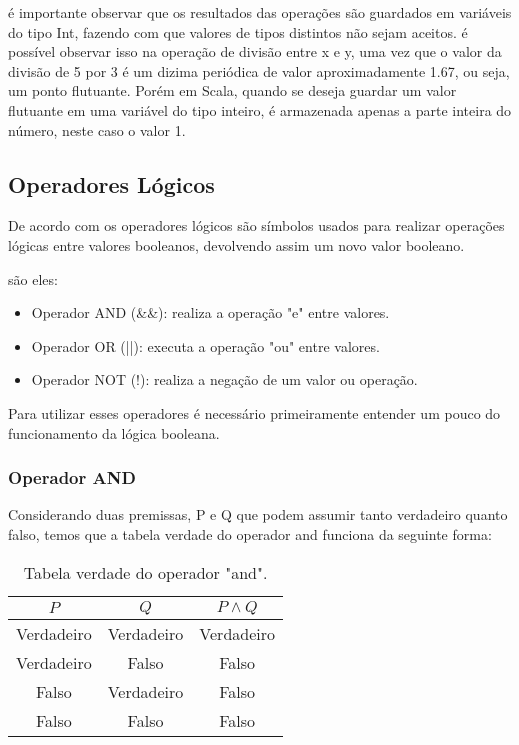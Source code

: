	\'{e} importante observar que os resultados das opera\c{c}\~{o}es s\~{a}o guardados em vari\'{a}veis do tipo Int, fazendo com que valores de tipos distintos não sejam aceitos. \'{e} poss\'{i}vel observar isso na opera\c{c}\~{a}o de divis\~{a}o entre x e y, uma vez que o valor da divis\~{a}o de 5 por 3 \'{e} um dizima periódica de valor aproximadamente 1.67, ou seja, um ponto flutuante. Por\'{e}m em Scala, quando se deseja guardar um valor flutuante em uma vari\'{a}vel do tipo inteiro, \'{e} armazenada apenas a parte inteira do n\'{u}mero, neste caso o valor 1.
	
	\subsection{Operadores L\'{o}gicos}
	
	De acordo com \cite{Wampler2021} os operadores l\'{o}gicos s\~{a}o símbolos usados para realizar opera\c{c}\~{o}es l\'{o}gicas entre valores booleanos, devolvendo assim um novo valor booleano.
	
	s\~{a}o eles:
	
	\begin{itemize}
		\item Operador AND (\&\&): realiza a opera\c{c}\~{a}o "e" entre valores.
		\item Operador OR (||): executa a opera\c{c}\~{a}o "ou" entre valores.
		\item Operador NOT (!): realiza a nega\c{c}\~{a}o de um valor ou opera\c{c}\~{a}o.
	\end{itemize}
	
	Para utilizar esses operadores \'{e} necess\'{a}rio primeiramente entender um pouco do funcionamento da lógica booleana.
	\subsubsection{Operador AND}
	Considerando duas premissas, P e Q que podem assumir tanto verdadeiro quanto falso, temos que a tabela verdade do operador and funciona da seguinte forma:
	\begin{table}[h!]
		\centering
		\begin{tabular}{|c|c||c|}
			\hline
			$P$ & $Q$ & $P \land Q$ \\
			\hline
			\hline
			Verdadeiro & Verdadeiro & Verdadeiro \\
			\hline
			Verdadeiro & Falso & Falso \\
			\hline
			Falso & Verdadeiro & Falso \\
			\hline
			Falso & Falso & Falso \\
			\hline
		\end{tabular}
		\caption{Tabela verdade do operador "and".}
		\label{tab:and}
	\end{table}

